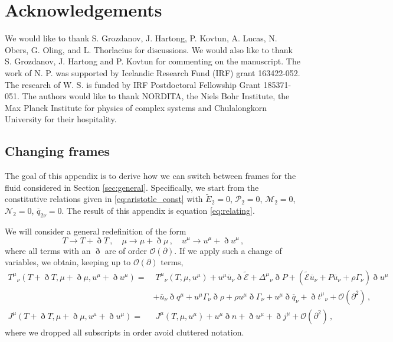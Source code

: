 \documentclass[superscriptaddress,prd,nofootinbib,preprintnumbers,longbibliography,11pt,eqsecnum]{revtex4-1}
\begin{document}
\newpage
\section*{Acknowledgements}
We would like to thank S. Grozdanov, J. Hartong, P. Kovtun, A. Lucas, N. Obers, G. Oling, and L. Thorlacius for discussions. We would also like to thank S. Grozdanov, J. Hartong and P. Kovtun for commenting on the manuscript. The work of N. P. was supported by Icelandic Research Fund (IRF) grant 163422-052. The research of W. S. is funded by IRF Postdoctoral Fellowship Grant 185371-051. The authors would like to thank NORDITA, the Niels Bohr Institute, the Max Planck Institute for physics of complex systems and Chulalongkorn University for their hospitality. 


\begin{appendix}
\section{Changing frames}\label{appendix1}

The goal of this appendix is to derive how we can switch between frames for the fluid considered in Section \ref{sec:general}. Specifically, we start from the constitutive relations given in \eqref{eq:aristotle_const} with $\tilde{E}_{2}=0$, $\mathcal{P}_{2}=0$, $\mathcal{M}_{2}=0$, $\mathcal{N}_{2}=0$, $\overline{q}_{2\nu}=0$. The result of this appendix is equation \eqref{eq:relating}.

We will consider a general redefinition of the form
\begin{equation}
	T
	\to
	T
	+
	\eth T
	\,,\quad
	\mu
	\to
	\mu
	+
	\eth \mu
	\,, \quad
	u^{\mu}
	\to
	u^{\mu}
	+
	\eth u^{\mu}
	\,,
\end{equation}
where all terms with an $\eth$ are of order $\mathcal{O}(\partial)$. If we apply such a change of variables, we obtain, keeping up to $\mathcal{O}(\partial)$ terms,
\begin{equation}\begin{aligned}
	T^{\mu}_{\;\;\,\nu}(T+\eth T,\mu+\eth\mu,u^{\mu}+\eth u^{\mu})
	=&\;
	T^{\mu}_{\;\;\,\nu}(T,\mu,u^{\mu})
	+
	 u^{\mu}\overline{u}_{\nu}\eth \tilde{\mathcal{E}}
	+
\Delta^{\mu}_{\;\;\,\nu}\eth P
	+
	\left(\tilde{\mathcal{E}} \overline{u}_{\nu}
		+
		P\overline{u}_{\nu}
		+
		\rho \Gamma_{\nu}
	\right)\eth u^{\mu}
	\\
	&
	+
	\overline{u}_{\nu}\eth q^{\mu}
	+
u^{\mu}\Gamma_{\nu}\eth \rho
	+
	\rho u^{\mu}\eth \Gamma_{\nu}
	+
	u^{\mu}\eth \overline{q}_{\nu}
	+
	\eth t^{\mu}_{\;\;\,\nu}
	+
	\mathcal{O}(\partial^{2})
	\,,
	\\
	J^{\mu}(T+\eth T,\mu+\eth\mu,u^{\mu}+\eth u^{\mu})
	=&\;
	J^{\mu}(T,\mu,u^{\mu})
	+
	u^{\mu}\eth n
	+
	\eth u^{\mu}
	+
	\eth j^{\mu}
	+
	\mathcal{O}(\partial^{2})
	\,,
\end{aligned}\end{equation}
where we dropped all subscripts in order avoid cluttered notation.


\end{appendix}
\end{document}
